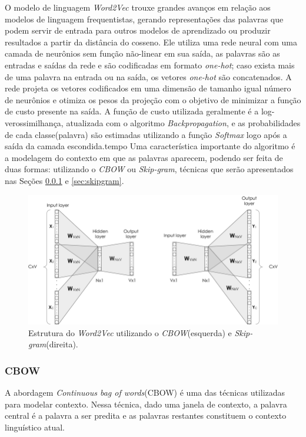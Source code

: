 \documentclass[11pt]{scrartcl} %
\begin{document}
O modelo de linguagem \textit{Word2Vec} trouxe grandes avanços em relação aos modelos de linguagem frequentistas, gerando representações das palavras que podem servir de entrada para outros modelos de aprendizado ou produzir resultados a partir da distância do cosseno. Ele utiliza uma rede neural com uma camada de neurônios sem função não-linear em sua saída, as palavras são as entradas e saídas da rede e são codificadas em formato \textit{one-hot}; caso exista mais de uma palavra na entrada ou na saída, os vetores \textit{one-hot} são concatenados. A rede projeta os vetores codificados em uma dimensão de tamanho igual número de neurônios e otimiza os pesos da projeção com o objetivo de minimizar a função de custo presente na saída. A função de custo utilizada geralmente é a log-verossimilhança, atualizada com o algoritmo \textit{Backpropagation}, e as probabilidades de cada classe(palavra) são estimadas utilizando a função \textit{Softmax} logo após a saída da camada escondida.tempo
Uma característica importante do algoritmo é a modelagem do contexto em que as palavras aparecem, podendo ser feita de duas formas: utilizando o \textit{CBOW} ou  \textit{Skip-gram}, técnicas que serão apresentados nas Seções \ref{sec:cbow} e \ref{sec:skipgram}.

\begin{figure}[H] %
	\centering
	\includegraphics[width=0.7\columnwidth]{./Figures/cbow_skip.png} %
	\caption{Estrutura do \textit{Word2Vec} utilizando o \textit{CBOW}(esquerda) e \textit{Skip-gram}(direita).}
\end{figure}


\subsubsection{CBOW}\label{sec:cbow}

A abordagem \textit{Continuous bag of words}(CBOW) é uma das técnicas utilizadas para modelar contexto. Nessa técnica, dado uma janela de contexto, a palavra central é a palavra a ser predita e as palavras restantes constituem o contexto linguístico atual.
\end{document}
